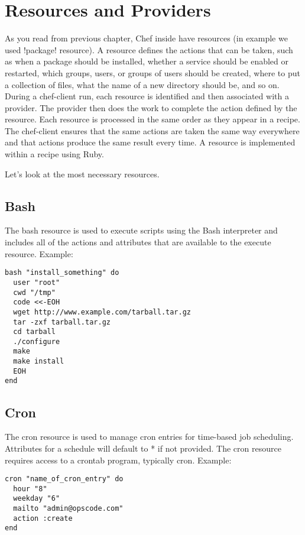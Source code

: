 \section{Resources and Providers}
\label{sec:cookbook-resources}

As you read from previous chapter, Chef inside have resources (in example we used \inline!package! resource). A resource defines the actions that can be taken, such as when a package should be installed, whether a service should be enabled or restarted, which groups, users, or groups of users should be created, where to put a collection of files, what the name of a new directory should be, and so on. During a chef-client run, each resource is identified and then associated with a provider. The provider then does the work to complete the action defined by the resource. Each resource is processed in the same order as they appear in a recipe. The chef-client ensures that the same actions are taken the same way everywhere and that actions produce the same result every time. A resource is implemented within a recipe using Ruby.

Let's look at the most necessary resources.

\subsection{Bash}

The bash resource is used to execute scripts using the Bash interpreter and includes all of the actions and attributes that are available to the execute resource. Example:

\begin{lstlisting}[label=lst:cookbook-resources-bash]
bash "install_something" do
  user "root"
  cwd "/tmp"
  code <<-EOH
  wget http://www.example.com/tarball.tar.gz
  tar -zxf tarball.tar.gz
  cd tarball
  ./configure
  make
  make install
  EOH
end
\end{lstlisting}

\subsection{Cron}

The cron resource is used to manage cron entries for time-based job scheduling. Attributes for a schedule will default to * if not provided. The cron resource requires access to a crontab program, typically cron. Example:

\begin{lstlisting}[label=lst:cookbook-resources-cron1]
cron "name_of_cron_entry" do
  hour "8"
  weekday "6"
  mailto "admin@opscode.com"
  action :create
end
\end{lstlisting}


